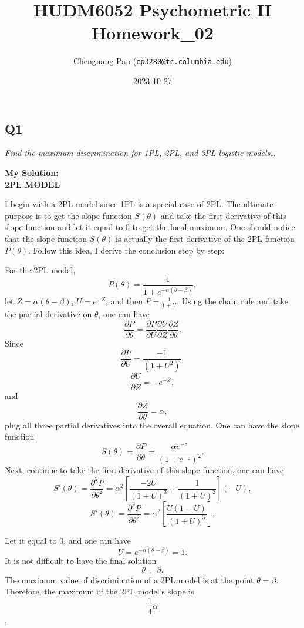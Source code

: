 \documentclass[
]{article}
\title{HUDM6052 Psychometric II Homework\_02}
\author{Chenguang Pan
(\href{mailto:cp3280@tc.columbia.edu}{\nolinkurl{cp3280@tc.columbia.edu}})}
\date{2023-10-27}
\begin{document}
\maketitle

\setcounter{tocdepth}{4}
\tableofcontents

\hypertarget{q1}{%
\subsection{Q1}\label{q1}}

\emph{Find the maximum discrimination for 1PL, 2PL, and 3PL logistic
models\ldots{}}

\textbf{My Solution:}\\
\textbf{2PL MODEL}

I begin with a 2PL model since 1PL is a special case of 2PL. The
ultimate purpose is to get the slope function \(S(\theta)\) and take the
first derivative of this slope function and let it equal to 0 to get the
local maximum. One should notice that the slope function \(S(\theta)\)
is actually the first derivative of the 2PL function \(P(\theta)\).
Follow this idea, I derive the conclusion step by step:

For the 2PL model, \[P(\theta)=\frac{1}{1+e^{-\alpha(\theta-\beta)}},\]
let \(Z = \alpha(\theta-\beta)\), \(U = e^{-Z}\), and then
\(P = \frac{1}{1+U}\). Using the chain rule and take the partial
derivative on \(\theta\), one can have
\[\frac{\partial P}{\partial \theta}=\frac{\partial P}{\partial U}\frac{\partial U}{\partial Z}\frac{\partial Z}{\partial \theta}. \]
Since \[\frac{\partial P}{\partial U}=\frac{-1}{(1+U^2)},\]
\[\frac{\partial U}{\partial Z}=-e^{-Z},\] and
\[\frac{\partial Z}{\partial \theta}= \alpha,\] plug all three partial
derivatives into the overall equation. One can have the slope function
\[S(\theta)=\frac{\partial P}{\partial \theta}=\frac{\alpha e^{-z}}{(1 + e^{-z})^2}.\]
Next, continue to take the first derivative of this slope function, one
can have
\[S'(\theta)=\frac{\partial^2 P}{\partial \theta^2}=\alpha^2[\frac{-2U}{(1+U)^3}+\frac{1}{(1+U)^2}](-U),\]
\[S'(\theta)=\frac{\partial^2 P}{\partial \theta^2}=\alpha^2[\frac{U(1-U)}{(1+U)^3}].\]

Let it equal to 0, and one can have \[U=e^{-\alpha(\theta-\beta)}=1.\]
It is not difficult to have the final solution \[\theta = \beta.\] The
maximum value of discrimination of a 2PL model is at the point
\(\theta =\beta\).\\
Therefore, the maximum of the 2PL model's slope is
\[\frac{1}{4}\alpha\].
\end{document}
